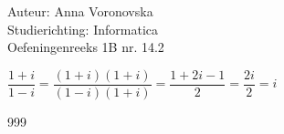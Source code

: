 \documentclass[a4paper]{article}
\begin{document}
  
\noindent \large Auteur: Anna Voronovska \\
\noindent \large Studierichting: Informatica\\
\noindent \large Oefeningenreeks 1B nr. 14.2\\

\medskip

\normalsize


$\dfrac{1+i}{1-i}=\dfrac{(1+i)(1+i)}{(1-i)(1+i)}= \dfrac{1+2i-1}{2}=\dfrac{2i}{2}=i$


\begin{thebibliography}{999}
\end{thebibliography}
\end{document}
